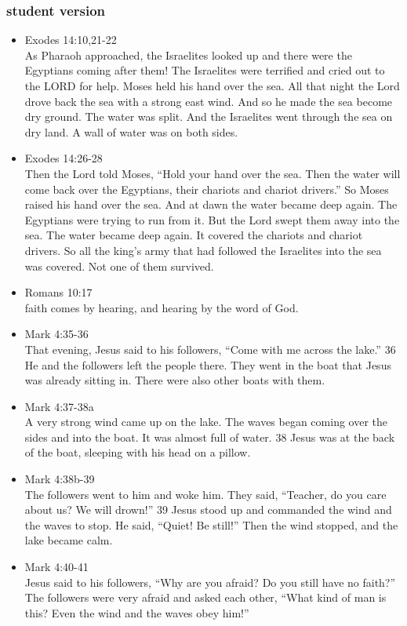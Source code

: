 \subsubsection{student version}
\large
\begin{itemize}
\item Exodes 14:10,21-22\\
As Pharaoh approached, the Israelites looked up and there were the Egyptians coming after them! The Israelites were terrified and cried out to the LORD for help. Moses held his hand over the sea. All that night the Lord drove back the sea with a strong east wind. And so he made the sea become dry ground. The water was split. And the Israelites went through the sea on dry land. A wall of water was on both sides.

\item Exodes 14:26-28\\
Then the Lord told Moses, “Hold your hand over the sea. Then the water will come back over the Egyptians, their chariots and chariot drivers.” So Moses raised his hand over the sea. And at dawn the water became deep again. The Egyptians were trying to run from it. But the Lord swept them away into the sea. The water became deep again. It covered the chariots and chariot drivers. So all the king's army that had followed the Israelites into the sea was covered. Not one of them survived.

\item Romans 10:17 \\faith comes by hearing, and hearing by the word of God.

\item Mark 4:35-36\\
That evening, Jesus said to his followers, “Come with me across the lake.” 36 He and the followers left the people there. They went in the boat that Jesus was already sitting in. There were also other boats with them. 

\item Mark 4:37-38a\\ A very strong wind came up on the lake. The waves began coming over the sides and into the boat. It was almost full of water. 38 Jesus was at the back of the boat, sleeping with his head on a pillow. 

\item Mark 4:38b-39\\The followers went to him and woke him. They said, “Teacher, do you care about us? We will drown!” 39 Jesus stood up and commanded the wind and the waves to stop. He said, “Quiet! Be still!” Then the wind stopped, and the lake became calm.

\item Mark 4:40-41\\Jesus said to his followers, “Why are you afraid? Do you still have no faith?” The followers were very afraid and asked each other, “What kind of man is this? Even the wind and the waves obey him!”
\end{itemize}

